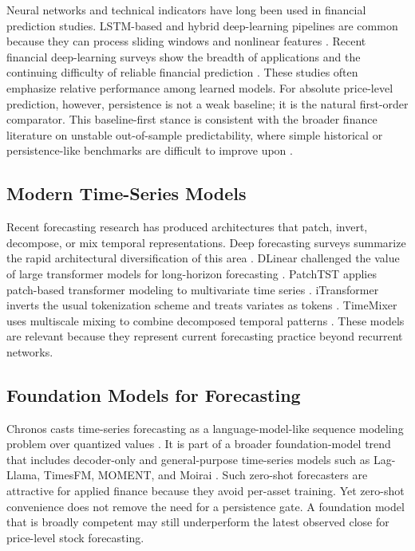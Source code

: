 \documentclass[11pt]{article}
\begin{document}
Neural networks and technical indicators have long been used in financial prediction studies. LSTM-based and hybrid deep-learning pipelines are common because they can process sliding windows and nonlinear features \cite{bao2017deep,patel2015trend}. Recent financial deep-learning surveys show the breadth of applications and the continuing difficulty of reliable financial prediction \cite{sezer2020stockreview,ozbayoglu2020financialsurvey}. These studies often emphasize relative performance among learned models. For absolute price-level prediction, however, persistence is not a weak baseline; it is the natural first-order comparator. This baseline-first stance is consistent with the broader finance literature on unstable out-of-sample predictability, where simple historical or persistence-like benchmarks are difficult to improve upon \cite{campbell2008predicting,welch2008comprehensive}.

\subsection{Modern Time-Series Models}

Recent forecasting research has produced architectures that patch, invert, decompose, or mix temporal representations. Deep forecasting surveys summarize the rapid architectural diversification of this area \cite{lim2021survey,benidis2022tutorial}. DLinear challenged the value of large transformer models for long-horizon forecasting \cite{zeng2023transformers}. PatchTST applies patch-based transformer modeling to multivariate time series \cite{nie2023patchtst}. iTransformer inverts the usual tokenization scheme and treats variates as tokens \cite{liu2024itransformer}. TimeMixer uses multiscale mixing to combine decomposed temporal patterns \cite{wang2024timemixer}. These models are relevant because they represent current forecasting practice beyond recurrent networks.

\subsection{Foundation Models for Forecasting}

Chronos casts time-series forecasting as a language-model-like sequence modeling problem over quantized values \cite{ansari2024chronos}. It is part of a broader foundation-model trend that includes decoder-only and general-purpose time-series models such as Lag-Llama, TimesFM, MOMENT, and Moirai \cite{rasul2023lagllama,das2024timesfm,goswami2024moment,woo2024moirai}. Such zero-shot forecasters are attractive for applied finance because they avoid per-asset training. Yet zero-shot convenience does not remove the need for a persistence gate. A foundation model that is broadly competent may still underperform the latest observed close for price-level stock forecasting.
\end{document}
